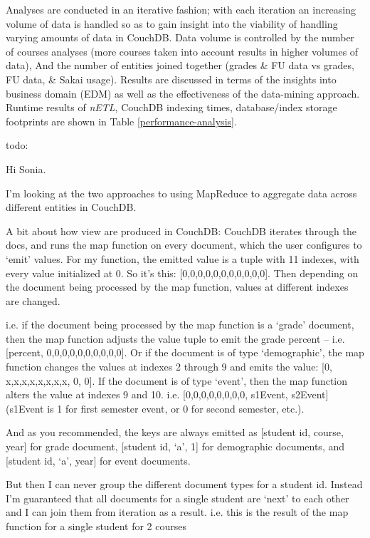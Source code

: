 Analyses are conducted in an iterative fashion; with each iteration an increasing volume of data is handled so as to gain insight into the viability of handling varying amounts of data in CouchDB. Data volume is controlled by the number of courses analyses (more courses taken into account results in higher volumes of data), And the number of entities joined together (grades \& FU data vs grades, FU data, \& Sakai usage). Results are discussed in terms of the insights into business domain (EDM) as well as the effectiveness of the data-mining approach. Runtime results of \textit{nETL}, CouchDB indexing times, database/index storage footprints are shown in Table \ref{performance-analysis}.






todo:

Hi Sonia.

I’m looking at the two approaches to using MapReduce to aggregate data across different entities in CouchDB.

A bit about how view are produced in CouchDB:
CouchDB iterates through the docs, and runs the map function on every document, which the user configures to ‘emit’ values. For my function, the emitted value is a tuple with 11 indexes, with every value initialized at 0. So it’s this: [0,0,0,0,0,0,0,0,0,0,0]. Then depending on the document being processed by the map function, values at different indexes are changed.

i.e. if the document being processed by the map function is a ‘grade’ document, then the map function adjusts the value tuple to emit the grade percent – i.e. [percent, 0,0,0,0,0,0,0,0,0,0]. Or if the document is of type ‘demographic’, the map function changes the values at indexes 2 through 9 and emits the value: [0, x,x,x,x,x,x,x,x, 0, 0]. If the document is of type ‘event’, then the map function alters the value at indexes 9 and 10. i.e. [0,0,0,0,0,0,0,0, s1Event, s2Event] (s1Event is 1 for first semester event, or 0 for second semester, etc.).

And as you recommended, the keys are always emitted as [student id, course, year] for grade document, [student id, ‘a’, 1] for demographic documents, and [student id, ‘a’, year] for event documents.

But then I can never group the different document types for a student id. Instead I’m guaranteed that all documents for a single student are ‘next’ to each other and I can join them from iteration as a result. i.e. this is the result of the map function for a single student for 2 courses

